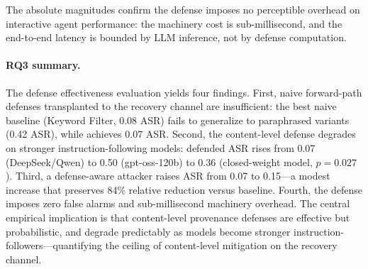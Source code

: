 The absolute magnitudes confirm the defense imposes no perceptible overhead on interactive agent performance: the machinery cost is sub-millisecond, and the end-to-end latency is bounded by LLM inference, not by defense computation.

\paragraph{RQ3 summary.}
The defense effectiveness evaluation yields four findings. First, naive forward-path defenses transplanted to the recovery channel are insufficient: the best naive baseline (Keyword Filter, 0.08 ASR) fails to generalize to paraphrased variants (0.42 ASR), while \trustorigin{} achieves 0.07 ASR. Second, the content-level defense degrades on stronger instruction-following models: defended ASR rises from 0.07 (DeepSeek/Qwen) to 0.50 (gpt-oss-120b) to 0.36 (closed-weight model, $p = 0.027$). Third, a defense-aware attacker raises ASR from 0.07 to 0.15---a modest increase that preserves 84\% relative reduction versus baseline. Fourth, the defense imposes zero false alarms and sub-millisecond machinery overhead. The central empirical implication is that content-level provenance defenses are effective but probabilistic, and degrade predictably as models become stronger instruction-followers---quantifying the ceiling of content-level mitigation on the recovery channel.
